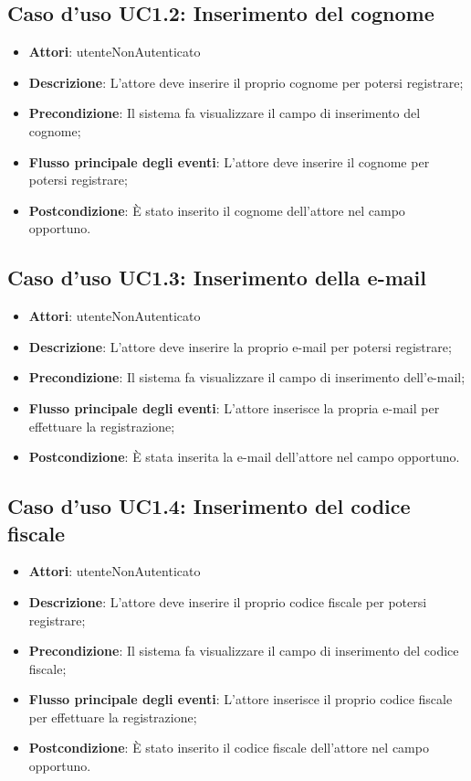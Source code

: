 \subsection{Caso d'uso \texorpdfstring{UC1.2}{UC1.2}: Inserimento del cognome}
\begin{itemize}
\item \textbf{Attori}: utenteNonAutenticato
\item \textbf{Descrizione}: L'attore deve inserire il proprio cognome per potersi registrare;
\item \textbf{Precondizione}: Il sistema fa visualizzare il campo di inserimento del cognome;
\item \textbf{Flusso principale degli eventi}: L'attore deve inserire il cognome per potersi registrare;
\item \textbf{Postcondizione}: È stato inserito il cognome dell'attore nel campo opportuno.
\end{itemize}
\subsection{Caso d'uso \texorpdfstring{UC1.3}{UC1.3}: Inserimento della e-mail}
\begin{itemize}
\item \textbf{Attori}: utenteNonAutenticato
\item \textbf{Descrizione}: L'attore deve inserire la proprio e-mail per potersi registrare;
\item \textbf{Precondizione}: Il sistema fa visualizzare il campo di inserimento dell'e-mail;
\item \textbf{Flusso principale degli eventi}: L'attore inserisce la propria e-mail per effettuare la registrazione;
\item \textbf{Postcondizione}: È stata inserita la e-mail dell'attore nel campo opportuno.
\end{itemize}
\subsection{Caso d'uso \texorpdfstring{UC1.4}{UC1.4}: Inserimento del codice fiscale}
\begin{itemize}
\item \textbf{Attori}: utenteNonAutenticato
\item \textbf{Descrizione}: L'attore deve inserire il proprio codice fiscale per potersi registrare;
\item \textbf{Precondizione}: Il sistema fa visualizzare il campo di inserimento del codice fiscale;
\item \textbf{Flusso principale degli eventi}: L'attore inserisce il proprio codice fiscale per effettuare la registrazione;
\item \textbf{Postcondizione}: È stato inserito il codice fiscale dell'attore nel campo opportuno.
\end{itemize}
